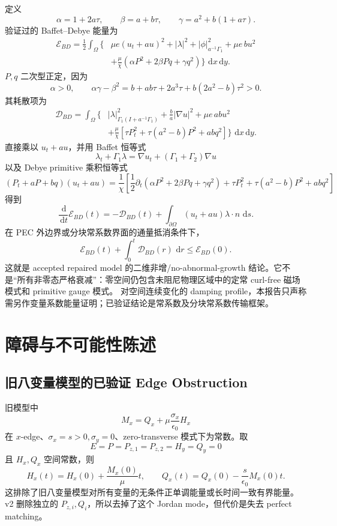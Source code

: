 \documentclass[UTF8,a4paper,11pt]{ctexart}
\newcommand{\dd}{\,\mathrm d}
\newcommand{\Om}{\Omega}
\newcommand{\Ecal}{\mathcal E}
\newcommand{\Dcal}{\mathcal D}
\begin{document}
定义
\[
\alpha=1+2a\tau,\qquad \beta=a+b\tau,\qquad \gamma=a^2+b(1+a\tau).
\]
验证过的 Baffet--Debye 能量为
\[
\boxed{
\begin{aligned}
\Ecal_{BD}
=\frac12\int_\Om\{&
\mu e(u_t+a u)^2+|\lambda|^2+|\phi|_{a^{-1}\Gamma_1}^2+\mu e\,b u^2\\
&+\frac{\mu}{\chi}\left(\alpha P^2+2\beta Pq+\gamma q^2\right)
\}\,\dd x\dd y .
\end{aligned}}
\]
\(P,q\) 二次型正定，因为
\[
\alpha>0,\qquad
\alpha\gamma-\beta^2
=b+ab\tau+2a^3\tau+b(2a^2-b)\tau^2>0.
\]
其耗散项为
\[
\boxed{
\begin{aligned}
\Dcal_{BD}
=\int_\Om\{&
|\lambda|^2_{\Gamma_1(I+a^{-1}\Gamma_1)}
+\frac{b}{a}|\nabla u|^2+\mu e\,ab u^2\\
&+\frac{\mu}{\chi}\left[
\tau P_t^2+\tau(a^2-b)P^2+abq^2
\right]\}\,\dd x\dd y .
\end{aligned}}
\]
直接乘以 \(u_t+a u\)，并用 Baffet 恒等式
\[
\lambda_t+\Gamma_1\lambda
=\nabla u_t+(\Gamma_1+\Gamma_2)\nabla u
\]
以及 Debye primitive 乘积恒等式
\[
(P_t+aP+bq)(u_t+a u)
=\frac1\chi\left[
\frac12\partial_t(\alpha P^2+2\beta Pq+\gamma q^2)
+\tau P_t^2+\tau(a^2-b)P^2+abq^2
\right]
\]
得到
\[
\boxed{
\frac{\dd}{\dd t}\Ecal_{BD}(t)
=-\Dcal_{BD}(t)
+\int_{\partial\Om}(u_t+a u)\lambda\cdot n\,\dd s.}
\]
在 PEC 外边界或分块常系数界面的通量抵消条件下，
\[
\Ecal_{BD}(t)+\int_0^t\Dcal_{BD}(r)\,\dd r\le \Ecal_{BD}(0).
\]
这就是 accepted repaired model 的二维非增/no-abnormal-growth 结论。它不是“所有非零态严格衰减”：零空间仍包含未阻尼物理区域中的定常 curl-free 磁场模式和 primitive gauge 模式。
对空间连续变化的 damping profile，本报告只声称需另作变量系数能量证明；已验证结论是常系数及分块常系数传输框架。

\section{障碍与不可能性陈述}

\subsection{旧八变量模型的已验证 Edge Obstruction}

旧模型中
\[
M_x=Q_x+\mu\frac{\sigma_x}{\epsilon_0}H_x
\]
在 \(x\)-edge、\(\sigma_x=s>0,\sigma_y=0\)、zero-transverse 模式下为常数。取
\[
E=P=P_{z,1}=P_{z,2}=H_y=Q_y=0
\]
且 \(H_x,Q_x\) 空间常数，则
\[
H_x(t)=H_x(0)+\frac{M_x(0)}{\mu}t,
\qquad
Q_x(t)=Q_x(0)-\frac{s}{\epsilon_0}M_x(0)t.
\]
这排除了旧八变量模型对所有变量的无条件正单调能量或长时间一致有界能量。v2 删除独立的 \(P_{z,i},Q_i\)，所以去掉了这个 Jordan mode，但代价是失去 perfect matching。
\end{document}

